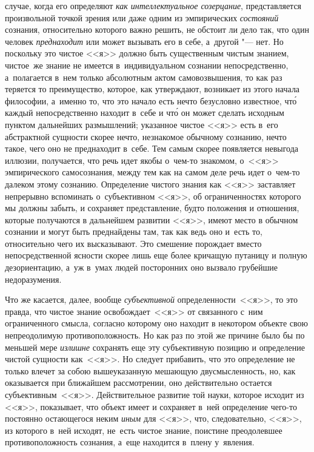 случае, когда его определяют {\em как интеллектуальное созерцание},
представляется произвольной точкой зрения или даже одним из эмпирических
{\em состояний} сознания, относительно которого важно решить, не обстоит ли
дело так, что один человек {\em преднаходит} или может вызывать его в себе,
а~другой "--- нет. Но поскольку это чистое <<я>> должно быть существенным
чистым знанием, чистое~же знание не имеется в~индивидуальном сознании
непосредственно, а~полагается в~нем только абсолютным актом самовозвышения, то
как раз теряется то преимущество, которое, как утверждают, возникает из этого
начала философии, а~именно то, что это начало есть нечто безусловно известное,
чт\'{о} каждый непосредственно находит в~себе и чт\'{о} он может сделать
исходным пунктом дальнейших размышлений; указанное чистое <<я>> есть в~его
абстрактной сущности скорее нечто, незнакомое обычному сознанию, нечто такое,
чего оно не преднаходит в~себе. Тем самым скорее появляется невыгода иллюзии,
получается, что речь идет якобы о~чем-то знакомом, о~<<я>> эмпирического
самосознания, между тем как на самом деле речь идет о~чем-то далеком этому
сознанию. Определение чистого знания как <<я>> заставляет непрерывно вспоминать
о~субъективном <<я>>, об ограниченностях которого мы должны забыть, и сохраняет
представление, будто положения и отношения, которые получаются в дальнейшем
развитии <<я>>, имеют место в обычном сознании и могут быть преднайдены там,
так как ведь оно и~есть то, относительно чего их высказывают. Это смешение
порождает вместо непосредственной ясности скорее лишь еще более кричащую
путаницу и полную дезориентацию, а~уж в~умах людей посторонних оно вызвало
грубейшие недоразумения.

Что же касается, далее, вообще {\em субъективной} определенности~<<я>>, то это
правда, что чистое знание освобождает~<<я>> от связанного с~ним ограниченного
смысла, согласно которому оно находит в некотором объекте свою непреодолимую
противоположность. Но как раз по этой же причине было бы по меньшей мере
{\em излишне} сохранять еще эту субъективную позицию и определение чистой
сущности как~<<я>>. Но следует прибавить, что это определение не только влечет
за собою вышеуказанную мешающую двусмысленность, но, как оказывается при
ближайшем рассмотрении, оно действительно остается субъективным~<<я>>.
Действительное развитие той науки, которое исходит из <<я>>, показывает, что
объект имеет и сохраняет в~ней определение чего-то постоянно остающегося неким
{\em иным} для <<я>>, что, следовательно, <<я>>, из которого в~ней исходят,
не~есть чистое знание, поистине преодолевшее противоположность сознания, а~еще
находится в~плену у~явления.

